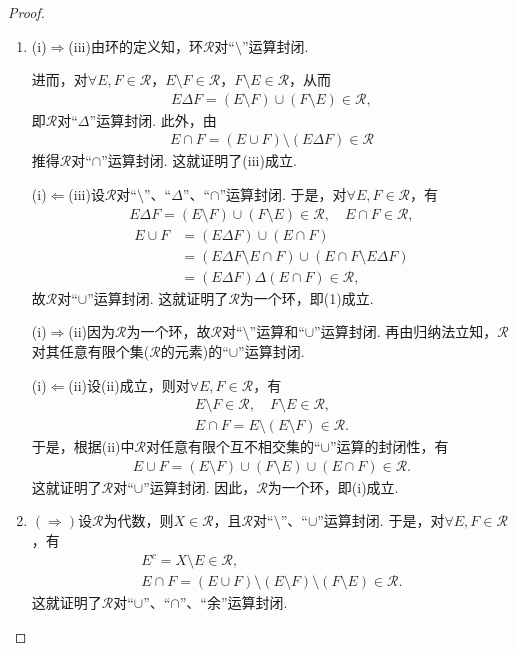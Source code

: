 \documentclass[../../main.tex]{subfiles}%
\begin{document}
\begin{proof}
\begin{enumerate}[(1)]
\item (i)$\Rightarrow$(iii)由环的定义知，环$\mathscr{R}$对“$\setminus$”运算封闭.

进而，对$\forall E,F\in\mathscr{R}$，$E\setminus F\in\mathscr{R}$，$F\setminus E\in\mathscr{R}$，从而
\begin{align*}
E\Delta F=(E\setminus F)\cup(F\setminus E)\in\mathscr{R},
\end{align*}
即$\mathscr{R}$对“$\Delta$”运算封闭. 此外，由
\begin{align*}
E\cap F=(E\cup F)\setminus(E\Delta F)\in\mathscr{R}
\end{align*}
推得$\mathscr{R}$对“$\cap$”运算封闭. 这就证明了(iii)成立.

(i)$\Leftarrow$(iii)设$\mathscr{R}$对“$\setminus$”、“$\Delta$”、“$\cap$”运算封闭. 于是，对$\forall E,F\in\mathscr{R}$，有
\begin{align*}
E\Delta F=(E\setminus F)\cup(F\setminus E)\in\mathscr{R},\quad E\cap F\in\mathscr{R}, 
\end{align*}
\begin{align*}
E\cup F&=(E\Delta F)\cup(E\cap F) \\
&=(E\Delta F\setminus E\cap F)\cup(E\cap F\setminus E\Delta F) \\
&=(E\Delta F)\Delta(E\cap F)\in\mathscr{R},
\end{align*}
故$\mathscr{R}$对“$\cup$”运算封闭. 这就证明了$\mathscr{R}$为一个环，即(1)成立.

(i)$\Rightarrow$(ii)因为$\mathscr{R}$为一个环，故$\mathscr{R}$对“$\setminus$”运算和“$\cup$”运算封闭. 再由归纳法立知，$\mathscr{R}$对其任意有限个集($\mathscr{R}$的元素)的“$\cup$”运算封闭.

(i)$\Leftarrow$(ii)设(ii)成立，则对$\forall E,F\in\mathscr{R}$，有
\begin{align*}
E\setminus F\in\mathscr{R},\quad F\setminus E\in\mathscr{R}, \\
E\cap F=E\setminus(E\setminus F)\in\mathscr{R}.
\end{align*}
于是，根据(ii)中$\mathscr{R}$对任意有限个互不相交集的“$\cup$”运算的封闭性，有
\begin{align*}
E\cup F=(E\setminus F)\cup(F\setminus E)\cup(E\cap F)\in\mathscr{R}.
\end{align*}
这就证明了$\mathscr{R}$对“$\cup$”运算封闭. 因此，$\mathscr{R}$为一个环，即(i)成立.

\item $(\Rightarrow)$设$\mathscr{R}$为代数，则$X\in\mathscr{R}$，且$\mathscr{R}$对“$\setminus$”、“$\cup$”运算封闭. 于是，对$\forall E,F\in\mathscr{R}$，有
\begin{align*}
E^c=X\setminus E\in\mathscr{R}, \\
E\cap F=(E\cup F)\setminus(E\setminus F)\setminus(F\setminus E)\in\mathscr{R}.
\end{align*}
这就证明了$\mathscr{R}$对“$\cup$”、“$\cap$”、“余”运算封闭.


\end{enumerate}
\end{proof}
\end{document}
